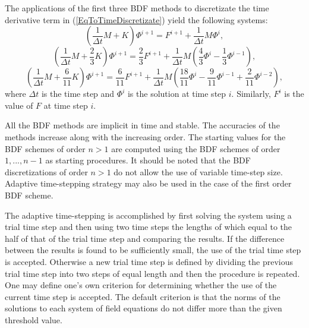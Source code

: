 \begin{versiona}
The applications of the first three BDF methods to discretizate the time derivative term
in (\ref{EqToTimeDiscretizate}) yield the following systems:
\begin{equation}\label{BDF1}
\left (\frac{1}{\Delta t}M+K\right )\Phi^{i+1} = F^{i+1} + \frac{1}{\Delta t}M\Phi^{i},
\end{equation}
\begin{equation}
\left (\frac{1}{\Delta t}M+\frac{2}{3}K\right )\Phi^{i+1} = \frac{2}{3}F^{i+1} + \frac{1}{\Delta t}M
\left( \frac{4}{3}\Phi^{i}-\frac{1}{3}\Phi^{i-1}\right ),
\end{equation}
\begin{equation}
\left (\frac{1}{\Delta t}M+\frac{6}{11}K\right )\Phi^{i+1} = \frac{6}{11}F^{i+1} + \frac{1}{\Delta t}M
\left( \frac{18}{11}\Phi^{i}-\frac{9}{11}\Phi^{i-1}+\frac{2}{11}\Phi^{i-2}\right ),
\end{equation}
where $\Delta t$ is the time step and $\Phi^{i}$ is the solution at time step $i$.
Similarly, $F^{i}$ is the value of $F$ at time step $i$.

All the BDF methods are implicit in time and stable. The accuracies of the
methods increase along with the increasing order. The starting values for the
BDF schemes of order $n>1$ are computed using the BDF schemes of order $1,...,n-1$
as starting procedures. It should be noted that the BDF discretizations of order $n>1$ 
do not allow the use of variable time-step size. 
Adaptive time-stepping strategy may also be used in the case of the first order BDF scheme.

The adaptive time-stepping is accomplished by first solving the system
using a trial time step and then using two time steps the lengths of which equal to the 
half of that of the trial time step and comparing the results. 
If the difference between the results is found to be sufficiently small, the use of
the trial time step is accepted. Otherwise a new trial time step is defined by dividing
the previous trial time step into two steps of equal length and then the procedure 
is repeated. One may define one's own criterion for determining whether the use of 
the current time step is accepted.
The default criterion is that the norms of the solutions to each system of field equations 
do not differ more than the given threshold value.


\end{versiona}
